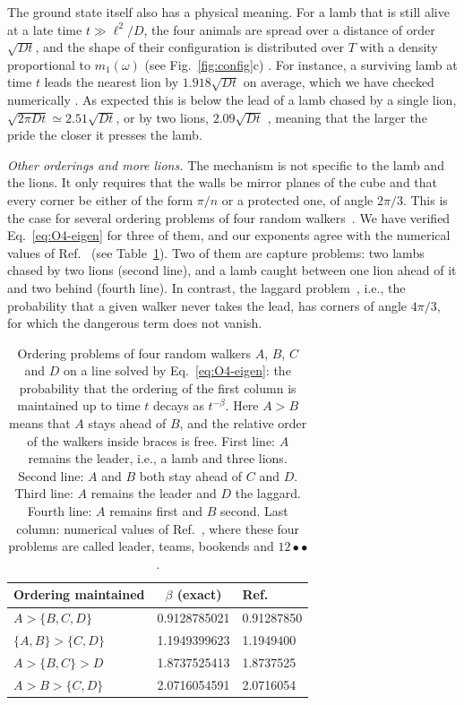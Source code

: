 \documentclass[aps,prl,twocolumn,superscriptaddress,floatfix,nofootinbib]{revtex4-2}
\begin{document}
The ground state itself also has a physical meaning. For a lamb that is still alive at a late time $t \gg \ell^2/D$, the four animals are spread over a distance of order $\sqrt{D t}$, and the shape of their configuration is distributed over $T$ with a density proportional to $m_1(\omega)$ (see Fig.~\ref{fig:config}c) \cite{SM}. For instance, a surviving lamb at time $t$ leads the nearest lion by $1.918\sqrt{D t}$ on average, which we have checked numerically \cite{SM}. As expected this is below the lead of a lamb chased by a single lion, $\sqrt{2 \pi D t} \simeq 2.51 \sqrt{D t}$, or by two lions, $2.09 \sqrt{D t}$ \cite{SM}, meaning that the larger the pride the closer it presses the lamb.

\emph{Other orderings and more lions.} The mechanism is not specific to the lamb and the lions. It only requires that the walls be mirror planes of the cube and that every corner be either of the form $\pi/n$ or a protected one, of angle $2\pi/3$. This is the case for several ordering problems of four random walkers~\cite{bA03,HbA18}. We have verified Eq.~\eqref{eq:O4-eigen} for three of them, and our exponents agree with the numerical values of Ref.~\cite{HbA18} (see Table~\ref{tab:orderings}). Two of them are capture problems: two lambs chased by two lions (second line), and a lamb caught between one lion ahead of it and two behind (fourth line). In contrast, the laggard problem~\cite{bA03}, i.e., the probability that a given walker never takes the lead, has corners of angle $4\pi/3$, for which the dangerous term does not vanish.

\begin{table}[t]
\caption{Ordering problems of four random walkers $A$, $B$, $C$ and $D$ on a line solved by Eq.~\eqref{eq:O4-eigen}: the probability that the ordering of the first column is maintained up to time $t$ decays as $t^{-\beta}$. Here $A > B$ means that $A$ stays ahead of $B$, and the relative order of the walkers inside braces is free. First line: $A$ remains the leader, i.e., a lamb and three lions. Second line: $A$ and $B$ both stay ahead of $C$ and $D$. Third line: $A$ remains the leader and $D$ the laggard. Fourth line: $A$ remains first and $B$ second. Last column: numerical values of Ref.~\cite{HbA18}, where these four problems are called leader, teams, bookends and $12{\bullet}{\bullet}$.}
\label{tab:orderings}
\begin{ruledtabular}
\begin{tabular}{lll}
Ordering maintained & \multicolumn{1}{c}{$\beta$ (exact)} & Ref.~\cite{HbA18}\\
\hline
$A > \{B, C, D\}$ & 0.9128785021 & 0.91287850\\
$\{A, B\} > \{C, D\}$ & 1.1949399623 & 1.1949400\\
$A > \{B, C\} > D$ & 1.8737525413 & 1.8737525\\
$A > B > \{C, D\}$ & 2.0716054591 & 2.0716054\\
\end{tabular}
\end{ruledtabular}
\end{table}
\end{document}
